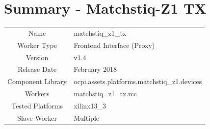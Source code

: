 \documentclass{article}
\author{} %
\date{Version \docVersion} %
\title{\docTitle}
\def\docVersion{1.4}
\def\comp{matchstiq\_z1\_tx}
\def\Comp{Matchstiq-Z1 TX}
\begin{document}
\section*{Summary - \Comp}
\begin{tabular}{|c|M{13.5cm}|}
	\hline
	                  &                                        \\
	\hline
	Name              & \comp                                  \\
	\hline
	Worker Type       & Frontend Interface (Proxy)             \\
	\hline
	Version           & v\docVersion \\
	\hline
	Release Date      & February 2018 \\
	\hline
	Component Library & ocpi.assets.platforms.matchstiq\_z1.devices \\
	\hline
	Workers           & matchstiq\_z1\_tx.rcc                      \\
	\hline
	Tested Platforms  & xilinx13\_3 \\
	\hline
	Slave Worker      & Multiple                               \\
	\hline
\end{tabular}
\end{document}
